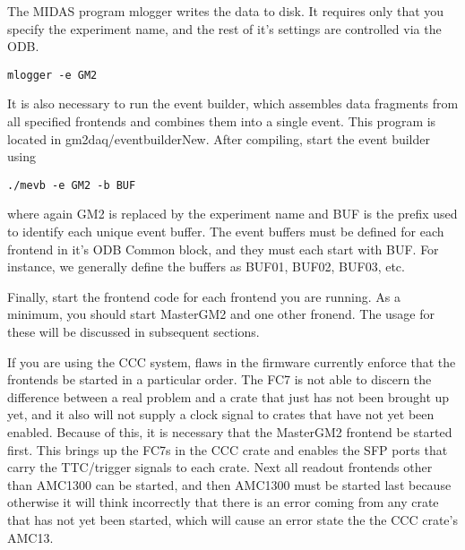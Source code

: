 The MIDAS program mlogger writes the data to disk. It requires only that you specify the experiment name, and the rest of it's settings are controlled via the ODB.

\begin{verbatim}
mlogger -e GM2
\end{verbatim}

It is also necessary to run the event builder, which assembles data fragments from all specified frontends and combines them into a single event. This program is located in gm2daq/eventbuilderNew. After compiling, start the event builder using

\begin{verbatim}
./mevb -e GM2 -b BUF
\end{verbatim}

where again GM2 is replaced by the experiment name and BUF is the prefix used to identify each unique event buffer. The event buffers must be defined for each frontend in it's ODB Common block, and they must each start with BUF. For instance, we generally define the buffers as BUF01, BUF02, BUF03, etc.

Finally, start the frontend code for each frontend you are running. As a minimum, you should start MasterGM2 and one other fronend. The usage for these will be discussed in subsequent sections.

If you are using the CCC system, flaws in the firmware currently enforce that the frontends be started in a particular order. The FC7 is not able to discern the difference between a real problem and a crate that just has not been brought up yet, and it also will not supply a clock signal to crates that have not yet been enabled. Because of this, it is necessary that the MasterGM2 frontend be started first. This brings up the FC7s in the CCC crate and enables the SFP ports that carry the TTC/trigger signals to each crate. Next all readout frontends other than AMC1300 can be started, and then AMC1300 must be started last because otherwise it will think incorrectly that there is an error coming from any crate that has not yet been started, which will cause an error state the the CCC crate's AMC13. 

